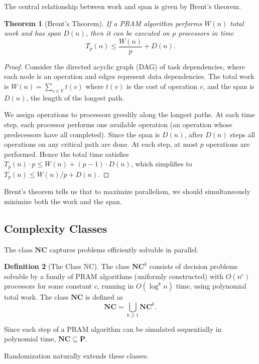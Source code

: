 \documentclass[twoside,12pt]{book}
\theoremstyle{plain}
\newtheorem{theorem}{Theorem}[chapter]
\theoremstyle{definition}
\newtheorem{definition}[theorem]{Definition}
\theoremstyle{remark}
\begin{document}
The central relationship between work and span is given by Brent's theorem.

\begin{theorem}[Brent's Theorem]
\label{thm:brent}
If a PRAM algorithm performs $W(n)$ total work and has span $D(n)$, then it can be executed on $p$ processors in time
\[
T_p(n) \leq \frac{W(n)}{p} + D(n).
\]
\end{theorem}

\begin{proof}
Consider the directed acyclic graph (DAG) of task dependencies, where each node is an operation and edges represent data dependencies. The total work is $W(n) = \sum_{v \in V} t(v)$ where $t(v)$ is the cost of operation $v$, and the span is $D(n)$, the length of the longest path. 

We assign operations to processors greedily along the longest paths. At each time step, each processor performs one available operation (an operation whose predecessors have all completed). Since the span is $D(n)$, after $D(n)$ steps all operations on any critical path are done. At each step, at most $p$ operations are performed. Hence the total time satisfies $T_p(n) \cdot p \leq W(n) + (p - 1) \cdot D(n)$, which simplifies to $T_p(n) \leq W(n)/p + D(n)$.
\end{proof}

Brent's theorem tells us that to maximize parallelism, we should simultaneously minimize both the work and the span.

\subsection{Complexity Classes}
\label{subsec:nc}

The class $\mathbf{NC}$ captures problems efficiently solvable in parallel.

\begin{definition}[The Class NC]
\label{def:nc}
The class $\mathbf{NC}^k$ consists of decision problems solvable by a family of PRAM algorithms (uniformly constructed) with $O(n^c)$ processors for some constant $c$, running in $O(\log^k n)$ time, using polynomial total work. The class $\mathbf{NC}$ is defined as
\[
\mathbf{NC} = \bigcup_{k \geq 1} \mathbf{NC}^k.
\]
\end{definition}

Since each step of a PRAM algorithm can be simulated sequentially in polynomial time, $\mathbf{NC} \subseteq \mathbf{P}$.

Randomization naturally extends these classes.
\end{document}
